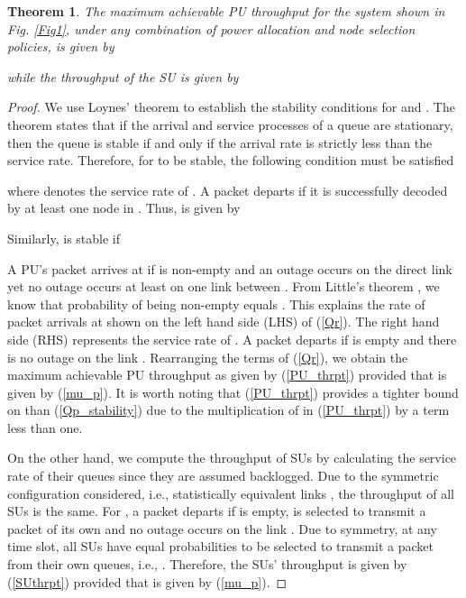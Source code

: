\documentclass[journal,twocolumn]{IEEEtran}
\newtheorem{theorem}{Theorem}
\begin{document}
\begin{theorem}\label{Thm1}
The maximum achievable PU throughput for the system shown in Fig. \ref{Fig1}, under any combination of  power allocation and node selection
policies, is given by

while the throughput of the SU  is given by

\end{theorem}
\begin{proof}
We use Loynes' theorem \cite{Loynes} to establish the stability conditions for  and . The theorem states that if the arrival and
service processes of a queue are stationary, then the queue is stable if and only if the arrival rate is strictly less than the service rate.
Therefore, for  to be stable, the following condition must be satisfied

where  denotes the service rate of . A packet departs  if it is successfully decoded by at least one node in . Thus,  is given by

Similarly,  is stable if

A PU's packet arrives at  if  is non-empty and an outage occurs on the direct link  yet no outage occurs at least on one link between . From Little's theorem \cite{Bertsekas}, we know that probability of  being non-empty equals
. This explains the rate of packet arrivals at  shown on the left hand side (LHS) of (\ref{Qr}). The right hand side (RHS) represents the service rate of . A packet departs  if  is empty and there is no outage on the link .
Rearranging the terms of (\ref{Qr}), we obtain the maximum achievable PU throughput as given by (\ref{PU_thrpt}) provided that  is given by (\ref{mu_p}). It is worth noting that (\ref{PU_thrpt}) provides a tighter bound on  than (\ref{Qp_stability}) due to the
multiplication of  in (\ref{PU_thrpt}) by a term less than one.

On the other hand, we compute the throughput of SUs by calculating the service rate of their queues since they are assumed backlogged. Due to the symmetric configuration considered, i.e., statistically equivalent links , the throughput of all SUs is the same. For , a packet departs  if  is empty,  is selected to transmit a packet of its own and no outage occurs on the link . Due to symmetry, at any time slot, all SUs have equal probabilities to be selected to transmit a packet from their own queues, i.e., . Therefore, the SUs' throughput is given by (\ref{SUthrpt}) provided that  is given by (\ref{mu_p}).
\end{proof}
\end{document}
